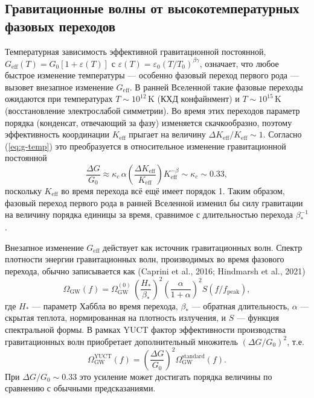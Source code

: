 \documentclass[12pt]{article}
\theoremstyle{remark}
\newcommand{\Keff}{K_{\mathrm{eff}}}
\newcommand{\eps}{\varepsilon}
\begin{document}
	\subsection{Гравитационные волны от высокотемпературных фазовых переходов}
	\label{subsec:gw}
	
	Температурная зависимость эффективной гравитационной постоянной,
	$G_{\mathrm{eff}}(T)=G_0[1+\eps(T)]$ с $\eps(T)=\eps_0(T/T_0)^{\beta\gamma}$,
	означает, что любое быстрое изменение температуры — особенно фазовый переход первого рода — вызовет внезапное изменение $G_{\mathrm{eff}}$.
	В ранней Вселенной такие фазовые переходы ожидаются при температурах
	$T\sim 10^{12}\,\mathrm{K}$ (КХД конфайнмент) и $T\sim 10^{15}\,\mathrm{K}$
	(восстановление электрослабой симметрии). Во время этих переходов параметр порядка (конденсат, отвечающий за фазу) изменяется скачкообразно, поэтому эффективность координации $\Keff$ прыгает на величину $\Delta\Keff/\Keff\sim 1$.
	Согласно (\ref{eq:g-temp}) это преобразуется в относительное изменение гравитационной постоянной
	\begin{equation}
		\frac{\Delta G}{G_0} \approx \kappa_c\,\alpha \left(\frac{\Delta\Keff}{\Keff}\right)
		\Keff^{-\beta} \sim \kappa_c \sim 0.33,
		\label{eq:deltaG-phase}
	\end{equation}
	поскольку $\Keff$ во время перехода всё ещё имеет порядок 1.
	Таким образом, фазовый переход первого рода в ранней Вселенной изменил бы силу гравитации на величину порядка единицы за время, сравнимое с длительностью перехода $\beta_*^{-1}$.
	
	Внезапное изменение $G_{\mathrm{eff}}$ действует как источник гравитационных волн.
	Спектр плотности энергии гравитационных волн, производимых во время фазового перехода, обычно записывается как (Caprini et al., 2016; Hindmarsh et al., 2021)
	\begin{equation}
		\Omega_{\mathrm{GW}}(f) = \Omega_{\mathrm{GW}}^{(0)} \,
		\left(\frac{H_*}{\beta_*}\right)^2 \left(\frac{\alpha}{1+\alpha}\right)^2
		S(f/f_{\mathrm{peak}}),
	\end{equation}
	где $H_*$ — параметр Хаббла во время перехода, $\beta_*$ — обратная длительность,
	$\alpha$ — скрытая теплота, нормированная на плотность излучения, и $S$ — функция спектральной формы.
	В рамках YUCT фактор эффективности производства гравитационных волн приобретает дополнительный множитель $(\Delta G/G_0)^2$, т.е.
	\begin{equation}
		\Omega_{\mathrm{GW}}^{\mathrm{YUCT}}(f) = \left(\frac{\Delta G}{G_0}\right)^2
		\Omega_{\mathrm{GW}}^{\mathrm{standard}}(f).
	\end{equation}
	При $\Delta G/G_0\sim 0.33$ это усиление может достигать порядка величины по сравнению с обычными предсказаниями.
	
\end{document}
